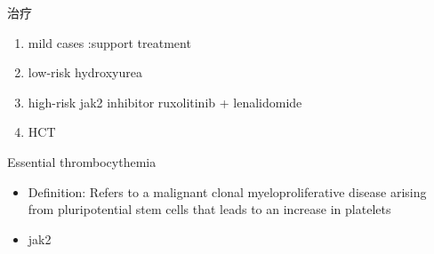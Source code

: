 \documentclass[
  ignorenonframetext,
]{beamer}
\begin{document}
\begin{frame}
\begin{block}{治疗}
\protect\hypertarget{ux6cbbux7597-3}{}
\begin{enumerate}
\item
  mild cases :support treatment
\item
  low-risk hydroxyurea
\item
  high-risk jak2 inhibitor ruxolitinib + lenalidomide
\item
  HCT
\end{enumerate}
\end{block}
\end{frame}

\begin{frame}
\begin{block}{Essential thrombocythemia}
\protect\hypertarget{essential-thrombocythemia}{}
\begin{itemize}
\item
  Definition: Refers to a malignant clonal myeloproliferative disease
  arising from pluripotential stem cells that leads to an increase in
  platelets
\item
  jak2
\end{itemize}
\end{block}
\end{frame}
\end{document}
